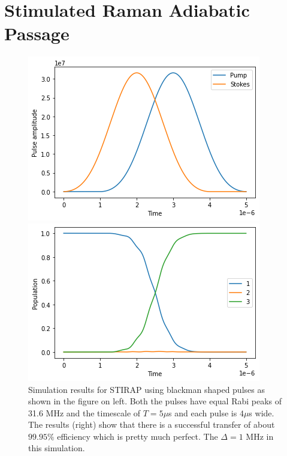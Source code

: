 \documentclass[%
 reprint,
 amsmath,amssymb,
 aps,
]{revtex4-2}
\begin{document}
\section{Stimulated Raman Adiabatic Passage}
\begin{figure}[ht]
\label{fig:sim0}
    \centering
    \begin{minipage}{0.47\textwidth}
        \centering
        \includegraphics[width=\textwidth]{images/sim-0-pulse.png} %
    \end{minipage}\hfill
    \begin{minipage}{0.47\textwidth}
        \centering
        \includegraphics[width=\textwidth]{images/sim-0-pop.png} %
    \end{minipage}
    \caption{Simulation results for STIRAP using blackman shaped pulses as shown in the figure on left. Both the pulses have equal Rabi peaks of 31.6 MHz and the timescale of $T=5\mu$s and each pulse is $4\mu$s wide. The results (right) show that there is a successful transfer of about $99.95\%$ efficiency which is pretty much perfect. The $\Delta = 1$ MHz in this simulation.}
\end{figure}
\end{document}
